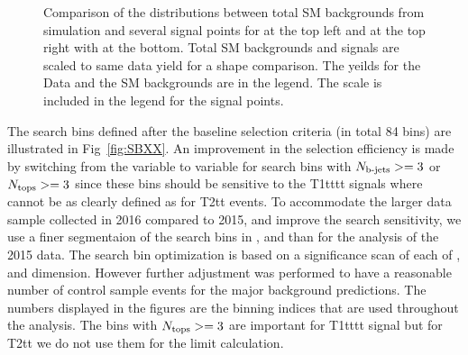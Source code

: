 \begin{figure}[h]
\begin{center}
    \caption{Comparison of the distributions between total SM backgrounds from simulation and several signal points for \MET at the top left and \MTTwo at the top right with \HT at the bottom. Total SM backgrounds and signals are scaled to same data yield for a shape comparison. The yeilds for the Data and the SM backgrounds are in the legend.  The scale is included in the legend for the signal points. }
    \label{fig:compSBvars2}
  \end{center}
\end{figure}

The search bins defined after the baseline selection criteria (in total 84 bins) are illustrated in Fig~\ref{fig:SBXX}. An improvement in the selection efficiency is made by switching from the \MTTwo variable to \HT variable for search bins with $N_{\text{b-jets}}>=3$ or $N_{\text{tops}}>=3$ since these bins should be sensitive to the T1tttt signals where \MTTwo cannot be as clearly defined as for T2tt events.
To accommodate the larger data sample collected in 2016 compared to 2015, and improve the search sensitivity, we use a finer segmentaion of the search bins in
\MET, \HT and \MTTwo than for the analysis of the 2015 data. The search bin optimization is based on a significance scan of each of \MET, \MTTwo and \HT dimension. However
further adjustment was performed to have a reasonable number of control sample events for the major background predictions.
The numbers displayed in the figures are the binning indices that are used throughout the analysis.
The bins with $N_{\text{tops}}>=3$ are important for T1tttt signal but for T2tt we do not use them for the limit calculation.

